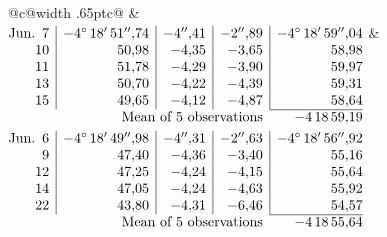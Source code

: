 \noindent\begin{tabular}{@{}c@{\hspace{.4em}\vrule width .65pt\hspace{.4em}}c@{}}
 &
 \\[.18ex]
\(\begin{array}[t]{@{}r|r|r|r|r@{}}
\text{Jun.}\enspace 7 & -4^\circ\,18'\,51''{,}74 & -4''{,}41 & -2''{,}89 & -4^\circ\,18'\,59''{,}04\\
10 & 50{,}98 & -4{,}35 & -3{,}65 & 58{,}98\\
11 & 51{,}78 & -4{,}29 & -3{,}90 & 59{,}97\\
13 & 50{,}70 & -4{,}22 & -4{,}39 & 59{,}31\\
15 & 49{,}65 & -4{,}12 & -4{,}87 & 58{,}64\\
\cline{5-5}
\multicolumn{4}{r}{\text{Mean of 5 observations}} & -4\,18\,59{,}19
\end{array}\)
&
\(\begin{array}[t]{@{}r|r|r|r|r@{}}
\text{Jun.}\enspace 6 & -4^\circ\,18'\,49''{,}98 & -4''{,}31 & -2''{,}63 & -4^\circ\,18'\,56''{,}92\\
9 & 47{,}40 & -4{,}36 & -3{,}40 & 55{,}16\\
12 & 47{,}25 & -4{,}24 & -4{,}15 & 55{,}64\\
14 & 47{,}05 & -4{,}24 & -4{,}63 & 55{,}92\\
22 & 43{,}80 & -4{,}31 & -6{,}46 & 54{,}57\\
\cline{5-5}
\multicolumn{4}{r}{\text{Mean of 5 observations}} & -4\,18\,55{,}64
\end{array}\)
\end{tabular}\par\medskip
{}
